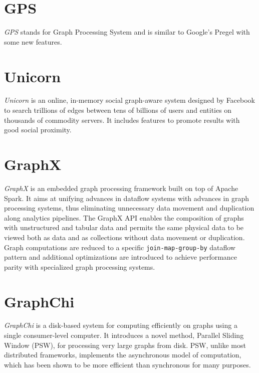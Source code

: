 \documentclass[letterpaper,twocolumn,10pt]{article}
\begin{document}
\section{GPS}
\textit{GPS} stands for Graph Processing System and is similar to Google's Pregel with some new features.

\section{Unicorn}
\textit{Unicorn} is an online, in-memory social graph-aware system designed by Facebook to search trillions of edges between tens of billions of users and entities on thousands of commodity servers. It includes features to promote results with good social proximity.

\section{GraphX}
\textit{GraphX} is an embedded graph processing framework built on top of Apache Spark. It aims at unifying advances in dataflow systems with advances in graph processing systems, thus eliminating unnecessary data movement and duplication along analytics pipelines. The GraphX API enables the composition of graphs with unstructured and tabular data and permits the same physical data to be viewed both as data and as collections without data movement or duplication.
Graph computations are reduced to a specific {\tt join-map-group-by} dataflow pattern and additional optimizations are introduced to achieve performance parity with specialized graph processing systems.

\section{GraphChi}
\textit{GraphChi} is a disk-based system for computing efficiently on graphs using a single consumer-level computer. It introduces a novel method, Parallel Sliding Window (PSW), for processing very large graphs from disk. PSW, unlike most distributed frameworks, implements the asynchronous model of computation, which has been shown to be more efficient than synchronous for many purposes.	
\end{document}
